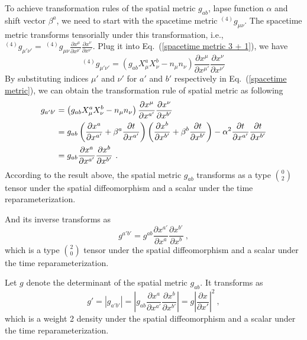 To achieve transformation rules of the spatial metric $g_{ab}$, lapse function $\alpha$ and shift vector $\beta^{a}$, we need to start with the spacetime metric $^{(4)}g_{\mu\nu}$. The spacetime metric transforms tensorially under this transformation, i.e., $^{(4)}g_{\mu' \nu'} =~^{(4)}g_{\mu\nu}\frac{\partial x^{\mu}}{\partial x^{\mu'}}\frac{\partial x^{\nu}}{\partial x^{\nu'}}$. Plug it into Eq.~(\ref{spacetime metric 3 + 1}), we have
\begin{equation}\label{spacetime metric}
^{\left(4\right)}g_{\mu'\nu'} = \left(g_{ab}X^{a}_{\mu}X^{b}_{\nu} - n_{\mu}n_{\nu}\right)\frac{\partial x^{\mu}}{\partial x^{\mu'}}\frac{\partial x^{\nu}}{\partial x^{\nu'}}
\end{equation}
By substituting indices $\mu'$ and $\nu'$ for $a'$ and $b'$ respectively in Eq.~(\ref{spacetime metric}), we can obtain the transformation rule of spatial metric as following
\begin{align}\label{spatialmetric}
g_{a'b'} & = \left(g_{ab}X^{a}_{\mu}X^{b}_{\nu} - n_{\mu}n_{\nu}\right)\frac{\partial x^{\mu}}{\partial x^{a'}}\frac{\partial x^{\nu}}{\partial x^{b'}}\notag\\
&= g_{ab}\left(\frac{\partial x^{a}}{\partial x^{a'}} + \beta^{a}\frac{\partial t}{\partial x^{a'}}\right)\left(\frac{\partial x^{b}}{\partial x^{b'}} + \beta^{b}\frac{\partial t}{\partial x^{b'}}\right) - \alpha^2\frac{\partial t}{\partial x^{a'}}\frac{\partial t}{\partial x^{b'}}\notag\\
& = g_{ab}\frac{\partial x^{a}}{\partial x^{a'}}\frac{\partial x^{b}}{\partial x^{b'}} \ .
\end{align}
According to the result above, the spatial metric $g_{ab}$ transforms as a type $0 \choose 2$ tensor under the spatial diffeomorphism and a scalar under the time reparameterization.

And its inverse transforms as
\begin{equation}\label{spatialmetricinverse}
g^{a'b'} = g^{ab}\frac{\partial x^{a'}}{\partial x^{a}}\frac{\partial x^{b'}}{\partial x^{b}} \ , 
\end{equation}
which is a type $2 \choose 0$ tensor under the spatial diffeomorphism and a scalar under the time reparameterization. 

Let $g$ denote the determinant of the spatial metric $g_{ab}$. It transforms as
\begin{equation}\label{spatialmetricdet}
g' = \left|g_{a'b'}\right| = \left|g_{ab}\frac{\partial x^{a}}{\partial x^{a'}}\frac{\partial x^{b}}{\partial x^{b'}}\right|  = g\left|\frac{\partial x}{\partial x'}\right|^{2} \ ,
\end{equation}
which is a weight 2 density under the spatial diffeomorphism and a scalar under the time reparameterization. 

